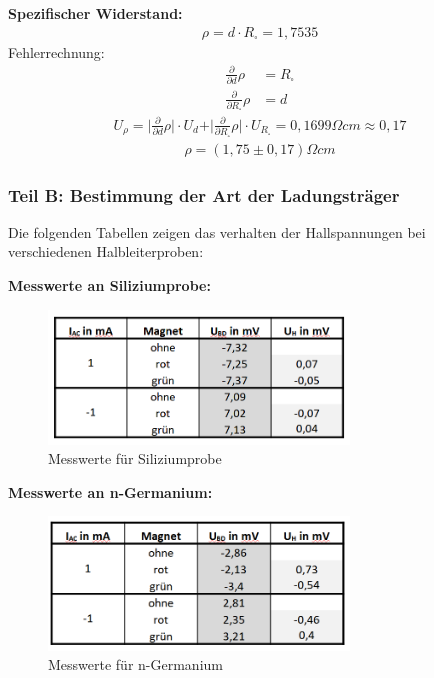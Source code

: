 \documentclass[a4paper]{scrartcl}
\numberwithin{equation}{subsection}
\begin{document}
\textbf{Spezifischer Widerstand:}
\begin{align}
\rho = d \cdot R_{\square} = 1,7535
\end{align}
Fehlerrechnung:
\begin{align*}
\frac{\partial}{\partial d} \rho &= R_{\square} \\
\frac{\partial}{\partial R_{\square}} \rho &= d
\end{align*}
\begin{align*}
U_{\rho} = \vert \frac{\partial}{\partial d} \rho \vert \cdot U_{d} + \vert \frac{\partial}{\partial R_{\square}} \rho \vert \cdot U_{R_{\square}} = 0,1699 \Omega cm \approx 0,17
\end{align*}
\begin{align*}
\rho = (1,75 \pm 0,17)\Omega cm
\end{align*}


\subsubsection{Teil B: Bestimmung der Art der Ladungsträger}
Die folgenden Tabellen zeigen das verhalten der Hallspannungen bei verschiedenen Halbleiterproben:

\textbf{Messwerte an Siliziumprobe:\\}

\begin{figure}[H]
\includegraphics[width=8cm]{tabelle_messwerte_silizium}
\centering
\caption{Messwerte für Siliziumprobe}
\centering
\label{fig:tabelle_messwerte_silizium}
\end{figure}

\textbf{Messwerte an n-Germanium:\\}

\begin{figure}[H]
\includegraphics[width=8cm]{tabelle_messwerte_n-germanium}
\centering
\caption{Messwerte für n-Germanium}
\centering
\label{fig:tabelle_messwerte_n-germanium}
\end{figure}
\end{document}
